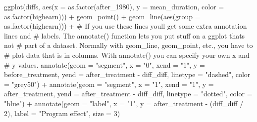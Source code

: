 \documentclass[
  letterpaper,
  DIV=11,
  numbers=noendperiod]{scrartcl}
\newenvironment{Shaded}{\begin{snugshade}}{\end{snugshade}}
\newcommand{\AttributeTok}[1]{\textcolor[rgb]{0.40,0.45,0.13}{#1}}
\newcommand{\CommentTok}[1]{\textcolor[rgb]{0.37,0.37,0.37}{#1}}
\newcommand{\DecValTok}[1]{\textcolor[rgb]{0.68,0.00,0.00}{#1}}
\newcommand{\FunctionTok}[1]{\textcolor[rgb]{0.28,0.35,0.67}{#1}}
\newcommand{\NormalTok}[1]{\textcolor[rgb]{0.00,0.23,0.31}{#1}}
\newcommand{\SpecialCharTok}[1]{\textcolor[rgb]{0.37,0.37,0.37}{#1}}
\newcommand{\StringTok}[1]{\textcolor[rgb]{0.13,0.47,0.30}{#1}}
\begin{document}
\begin{Shaded}
\begin{Highlighting}[]
\FunctionTok{ggplot}\NormalTok{(diffs, }\FunctionTok{aes}\NormalTok{(}\AttributeTok{x =} \FunctionTok{as.factor}\NormalTok{(after\_1980),}
                  \AttributeTok{y =}\NormalTok{ mean\_duration,}
                  \AttributeTok{color =} \FunctionTok{as.factor}\NormalTok{(highearn))) }\SpecialCharTok{+}
  \FunctionTok{geom\_point}\NormalTok{() }\SpecialCharTok{+}
  \FunctionTok{geom\_line}\NormalTok{(}\FunctionTok{aes}\NormalTok{(}\AttributeTok{group =} \FunctionTok{as.factor}\NormalTok{(highearn))) }\SpecialCharTok{+}
  \CommentTok{\# If you use these lines you\textquotesingle{}ll get some extra annotation lines and}
  \CommentTok{\# labels. The annotate() function lets you put stuff on a ggplot that\textquotesingle{}s not}
  \CommentTok{\# part of a dataset. Normally with geom\_line, geom\_point, etc., you have to}
  \CommentTok{\# plot data that is in columns. With annotate() you can specify your own x and}
  \CommentTok{\# y values.}
  \FunctionTok{annotate}\NormalTok{(}\AttributeTok{geom =} \StringTok{"segment"}\NormalTok{, }\AttributeTok{x =} \StringTok{"0"}\NormalTok{, }\AttributeTok{xend =} \StringTok{"1"}\NormalTok{,}
           \AttributeTok{y =}\NormalTok{ before\_treatment, }\AttributeTok{yend =}\NormalTok{ after\_treatment }\SpecialCharTok{{-}}\NormalTok{ diff\_diff,}
           \AttributeTok{linetype =} \StringTok{"dashed"}\NormalTok{, }\AttributeTok{color =} \StringTok{"grey50"}\NormalTok{) }\SpecialCharTok{+}
  \FunctionTok{annotate}\NormalTok{(}\AttributeTok{geom =} \StringTok{"segment"}\NormalTok{, }\AttributeTok{x =} \StringTok{"1"}\NormalTok{, }\AttributeTok{xend =} \StringTok{"1"}\NormalTok{,}
           \AttributeTok{y =}\NormalTok{ after\_treatment, }\AttributeTok{yend =}\NormalTok{ after\_treatment }\SpecialCharTok{{-}}\NormalTok{ diff\_diff,}
           \AttributeTok{linetype =} \StringTok{"dotted"}\NormalTok{, }\AttributeTok{color =} \StringTok{"blue"}\NormalTok{) }\SpecialCharTok{+}
  \FunctionTok{annotate}\NormalTok{(}\AttributeTok{geom =} \StringTok{"label"}\NormalTok{, }\AttributeTok{x =} \StringTok{"1"}\NormalTok{, }\AttributeTok{y =}\NormalTok{ after\_treatment }\SpecialCharTok{{-}}\NormalTok{ (diff\_diff }\SpecialCharTok{/} \DecValTok{2}\NormalTok{),}
           \AttributeTok{label =} \StringTok{"Program effect"}\NormalTok{, }\AttributeTok{size =} \DecValTok{3}\NormalTok{)}
\end{Highlighting}
\end{Shaded}
\end{document}
